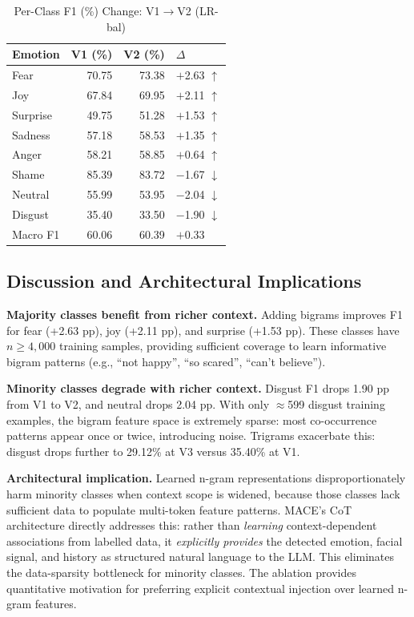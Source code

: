 \documentclass[conference]{IEEEtran}
\begin{document}
\begin{table}[htbp]
\centering
\caption{Per-Class F1 (\%) Change: V1$\to$V2 (LR-bal)}
\label{tab:ablation_perclass}
\begin{tabular}{lrrl}
\toprule
\textbf{Emotion} & \textbf{V1 (\%)} & \textbf{V2 (\%)} &
\textbf{$\Delta$} \\
\midrule
Fear     & 70.75 & 73.38 & $+$2.63 $\uparrow$ \\
Joy      & 67.84 & 69.95 & $+$2.11 $\uparrow$ \\
Surprise & 49.75 & 51.28 & $+$1.53 $\uparrow$ \\
Sadness  & 57.18 & 58.53 & $+$1.35 $\uparrow$ \\
Anger    & 58.21 & 58.85 & $+$0.64 $\uparrow$ \\
Shame    & 85.39 & 83.72 & $-$1.67 $\downarrow$ \\
Neutral  & 55.99 & 53.95 & $-$2.04 $\downarrow$ \\
Disgust  & 35.40 & 33.50 & $-$1.90 $\downarrow$ \\
\midrule
Macro F1 & 60.06 & 60.39 & $+$0.33 \\
\bottomrule
\end{tabular}
\end{table}

\subsection{Discussion and Architectural Implications}

\textbf{Majority classes benefit from richer context.}
Adding bigrams improves F1 for fear (+2.63 pp), joy (+2.11 pp),
and surprise (+1.53 pp).
These classes have $n \geq 4{,}000$ training samples, providing
sufficient coverage to learn informative bigram patterns
(e.g., ``not happy'', ``so scared'', ``can't believe'').

\textbf{Minority classes degrade with richer context.}
Disgust F1 drops 1.90 pp from V1 to V2, and neutral drops
2.04 pp.
With only $\approx$599 disgust training examples, the bigram
feature space is extremely sparse: most co-occurrence patterns
appear once or twice, introducing noise.
Trigrams exacerbate this: disgust drops further to 29.12\%
at V3 versus 35.40\% at V1.

\textbf{Architectural implication.}
Learned n-gram representations disproportionately harm
minority classes when context scope is widened, because
those classes lack sufficient data to populate multi-token
feature patterns.
MACE's CoT architecture directly addresses this:
rather than \emph{learning} context-dependent associations
from labelled data, it \emph{explicitly provides} the
detected emotion, facial signal, and history as structured
natural language to the LLM.
This eliminates the data-sparsity bottleneck for minority
classes.
The ablation provides quantitative motivation for preferring
explicit contextual injection over learned n-gram features.
\end{document}

